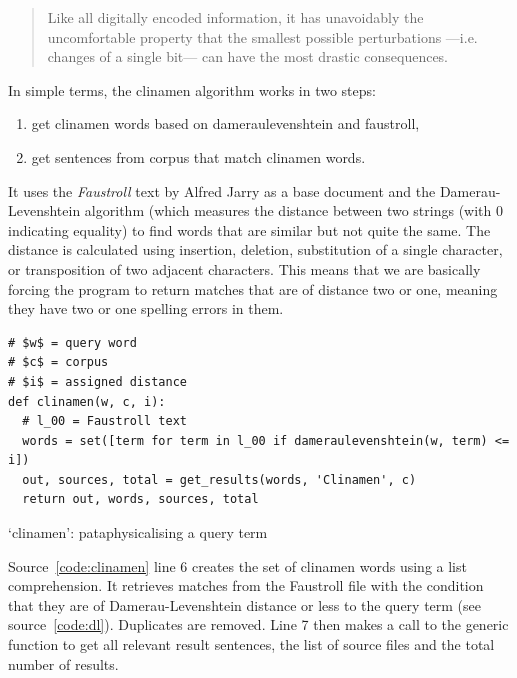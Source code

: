 \begin{quotation}
  Like all digitally encoded information, it has unavoidably the uncomfortable property that the smallest possible perturbations —i.e. changes of a single bit— can have the most drastic consequences. 
\end{quotation}

In simple terms, the clinamen algorithm works in two steps:
\begin{enumerate}
  \item get clinamen words based on dameraulevenshtein and faustroll,
  \item get sentences from corpus that match clinamen words.
\end{enumerate}

It uses the \textit{Faustroll} text by Alfred Jarry \citeyear{Jarry1996} as a base document and the Damerau-Levenshtein algorithm \autocite{Damerau1964, Levenshtein1966} (which measures the distance between two strings (with \num{0} indicating equality) to find words that are similar but not quite the same. The distance is calculated using insertion, deletion, substitution of a single character, or transposition of two adjacent characters. This means that we are basically forcing the program to return matches that are of distance two or one, meaning they have two or one spelling errors in them.

\begin{listing}
  \begin{verbatim}
# $w$ = query word
# $c$ = corpus
# $i$ = assigned distance
def clinamen(w, c, i):
  # l_00 = Faustroll text
  words = set([term for term in l_00 if dameraulevenshtein(w, term) <= i])
  out, sources, total = get_results(words, 'Clinamen', c)
  return out, words, sources, total
  \end{verbatim}
\caption[`clinamen' function]{`clinamen': pataphysicalising a query term}
\label{code:clinamen}
\end{listing}

Source~\ref{code:clinamen} line 6 creates the set of clinamen words using a list comprehension. It retrieves matches from the Faustroll file  with the condition that they are of Damerau-Levenshtein distance  or less to the query term  (see source~\ref{code:dl}). Duplicates are removed. Line 7 then makes a call to the generic  function to get all relevant result sentences, the list of source files and the total number of results.

